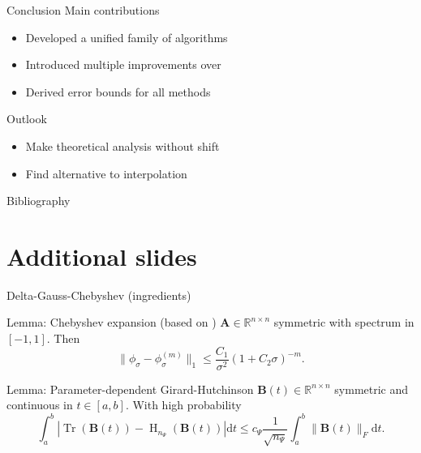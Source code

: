 \documentclass[aspectratio=169, leqno, 12pt]{beamer}
\newcommand{\mtx}[1]{\boldsymbol{#1}}
\DeclareMathOperator{\Tr}{Tr}
\DeclareMathOperator{\Hutch}{H}
\begin{document}
\begin{frame}{Conclusion}
    Main contributions
    \begin{itemize}
        \item Developed a unified family of algorithms 
        \item Introduced multiple improvements over \cite{lin2017randomized}
        \item Derived error bounds for all methods
    \end{itemize}
    Outlook
    \begin{itemize}
        \item Make theoretical analysis without shift
        \item Find alternative to interpolation
    \end{itemize}
\end{frame}

\begin{frame}[allowframebreaks]{Bibliography}
    
\end{frame}


\appendix
\section{Additional slides}

\begin{frame}{Delta-Gauss-Chebyshev (ingredients)}
    \begin{block}{Lemma: Chebyshev expansion (based on \cite{trefethen2008gauss})}
        $\mtx{A} \in \mathbb{R}^{n \times n}$ symmetric with spectrum
        in $[-1, 1]$. Then
        \begin{equation}
            \lVert  \phi_{\sigma} - \phi_{\sigma}^{(m)} \rVert _1 \leq \frac{C_1}{\sigma^2}(1 + C_2 \sigma)^{-m}.
        \end{equation}
    \end{block}
    \begin{block}{Lemma: Parameter-dependent Girard-Hutchinson \cite{he2023parameter}}
        $\mtx{B}(t) \in \mathbb{R}^{n \times n}$ symmetric and continuous in
        $t \in [a, b]$. With high probability
        \begin{equation}
            \int_{a}^{b} \left| \Tr(\mtx{B}(t)) - \Hutch_{n_{\Psi}}(\mtx{B}(t)) \right| \mathrm{d}t \leq c_{\Psi} \frac{1}{\sqrt{n_{\Psi}}} \int_{a}^{b} \lVert \mtx{B}(t) \rVert _F \mathrm{d}t.
        \end{equation}
    \end{block}
\end{frame}
\end{document}
